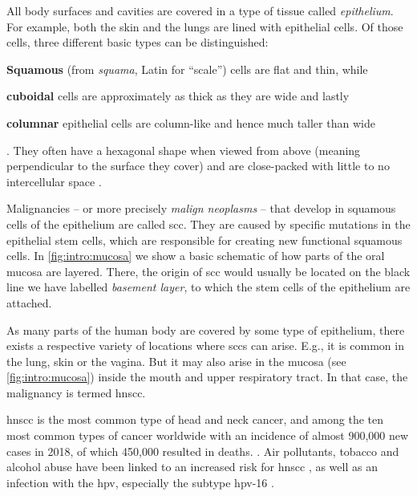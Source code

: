 \documentclass[\relativeRoot/main.tex]{subfiles}
\begin{document}
All body surfaces and cavities are covered in a type of tissue called \emph{epithelium}. For example, both the skin and the lungs are lined with epithelial cells. Of those cells, three different basic types can be distinguished:
\begin{enumerate*}[label={(\arabic*)}]
    \item \textbf{Squamous} (from \emph{squama}, Latin for ``scale'') cells are flat and thin, while 
    \item \textbf{cuboidal} cells are approximately as thick as they are wide and lastly
    \item \textbf{columnar} epithelial cells are column-like and hence much taller than wide
\end{enumerate*}.
They often have a hexagonal shape when viewed from above (meaning perpendicular to the surface they cover) and are close-packed with little to no intercellular space \cite{marieb_human_1995}.

Malignancies -- or more precisely \emph{malign neoplasms} -- that develop in squamous cells of the epithelium are called \gls{scc}. They are caused by specific mutations in the epithelial stem cells, which are responsible for creating new functional squamous cells. In \cref{fig:intro:mucosa} we show a basic schematic of how parts of the oral mucosa are layered. There, the origin of \gls{scc} would usually be located on the black line we have labelled \emph{basement layer}, to which the stem cells of the epithelium are attached.

As many parts of the human body are covered by some type of epithelium, there exists a respective variety of locations where \glspl{scc} can arise. E.g., it is common in the lung, skin or the vagina. But it may also arise in the mucosa (see \cref{fig:intro:mucosa}) inside the mouth and upper respiratory tract. In that case, the malignancy is termed \gls{hnscc}.

\gls{hnscc} is the most common type of head and neck cancer, and among the ten most common types of cancer worldwide with an incidence of almost 900,000 new cases in 2018, of which 450,000 resulted in deaths. \cite{johnson_head_2020,ferlay_estimating_2019,bray_global_2018}. Air pollutants, tobacco and alcohol abuse have been linked to an increased risk for \gls{hnscc} \cite{johnson_head_2020,wong_cancers_2014}, as well as an infection with the \gls{hpv}, especially the subtype \gls{hpv}-16 \cite{hennessey_human_2009}.
\end{document}
